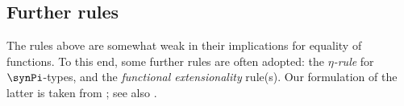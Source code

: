 \subsection{Further rules} \label{subsec:optional-rules}

The rules above are somewhat weak in their implications for equality of functions.  To this end, some further rules are often adopted: the \emph{$\eta$-rule} for $\synPi$-types, and the \emph{functional extensionality} rule(s).  Our formulation of the latter is taken from \cite{garner:on-the-strength}; see also \cite{hofmann:thesis}.


